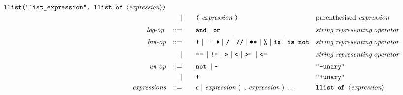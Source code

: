 \begin{alignat*}{9}
                                                            && \texttt{llist("list\_expression", llist of  } \langle \textit{expression}\rangle \texttt{)}                                                                                            \\
  &&                       && |   &\quad && \textbf{\texttt{(}}\  \textit{expression} \ \textbf{\texttt{)}} && \textrm{parenthesised}\ \textit{expression}                                            \\[1mm]
  && \textit{log-op}.      && ::= &\quad && \textbf{\texttt{and}}\ |\ \texttt{\textbf{or}}
                                                            && \textit{string representing operator}                                                                                                  \\[1mm]
  && \textit{bin-op}       && ::= &\quad && \textbf{\texttt{+}}\ |\ \textbf{\texttt{-}}\ |\ \textbf{\texttt{*}}\ |\ \textbf{\texttt{/}}\ |\ \textbf{\texttt{//}}\ |\ \textbf{\texttt{**}}\ |\ \textbf{\texttt{\%}}\ |\ \textbf{\texttt{is}}\ |\ \textbf{\texttt{is not}}
                                                            && \textit{string representing operator}                                                                                                  \\[1mm]
  &&                       && |   &\quad &&  \textbf{\texttt{== }} |\ \texttt{\textbf{!=}}\ |\ \texttt{\textbf{>}}\ |\ \texttt{\textbf{<}}\ |\ \texttt{\textbf{>= }} |\ \texttt{\textbf{<=}}
                                                            && \textit{string representing operator}                                                                                                  \\[1mm]
  && \textit{un-op}        && ::= &\quad && \textbf{\texttt{not }} |\ \textbf{\texttt{-}}
                                                            && \texttt{"-unary"}                                                                                                                      \\
  &&                       && |   &\quad && \textbf{\texttt{+}}
                                                            && \texttt{"+unary"}                                                                                                                      \\
  && \textit{expressions}  && ::= &\quad && \epsilon\ | \ \textit{expression}\ ( \ \textbf{\texttt{,}} \ \textit{expression} \ )\ \ldots
                                                            && \texttt{llist of  } \langle \textit{expression}\rangle                                                                          \\
\end{alignat*}



